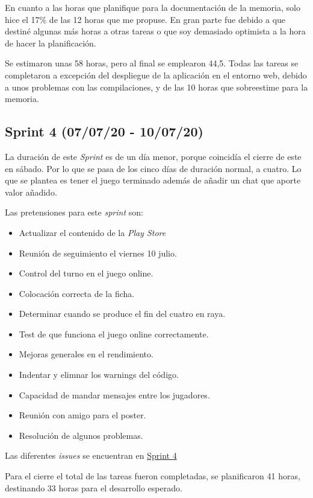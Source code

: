 En cuanto a las horas que planifique para la documentación de la memoria, solo hice el 17\% de las 12 horas que me propuse. En gran parte fue debido a que destiné algunas más horas a otras tareas o que soy demasiado optimista a la hora de hacer la planificación.

Se estimaron unas 58 horas, pero al final se emplearon 44,5. Todas las tareas se completaron a excepción del despliegue de la aplicación en el entorno web, debido a unos problemas con las compilaciones, y de las 10 horas que sobreestime para la memoria.

\subsection{Sprint 4 (07/07/20 - 10/07/20)}\label{sprint-4-070720---100720}
La duración de este \emph{Sprint} es de un día menor, porque coincidía el cierre de este en sábado. Por lo que se pasa de los cinco días de duración normal, a cuatro. Lo que se plantea es tener el juego terminado además de añadir un chat que aporte valor añadido.

Las pretensiones para este \emph{sprint} son:
\begin{itemize}
	\item Actualizar el contenido de la \emph{Play Store}
	\item Reunión de seguimiento el viernes 10 julio.
	\item Control del turno en el juego online.
	\item Colocación correcta de la ficha.
	\item Determinar cuando se produce el fin del cuatro en raya.
	\item Test de que funciona el juego online correctamente.
	\item Mejoras generales en el rendimiento.
	\item Indentar y elimnar los warnings del código.
	\item Capacidad de mandar mensajes entre los jugadores.
	\item Reunión con amigo para el poster.
	\item Resolución de algunos problemas.
\end{itemize}

Las diferentes \emph{issues} se encuentran en \href{https://github.com/scc0034/flutter_serpiente/milestone/4?closed=1}{Sprint 4}


Para el cierre el total de las tareas fueron completadas, se planificaron 41 horas, destinando 33 horas para el desarrollo esperado.

